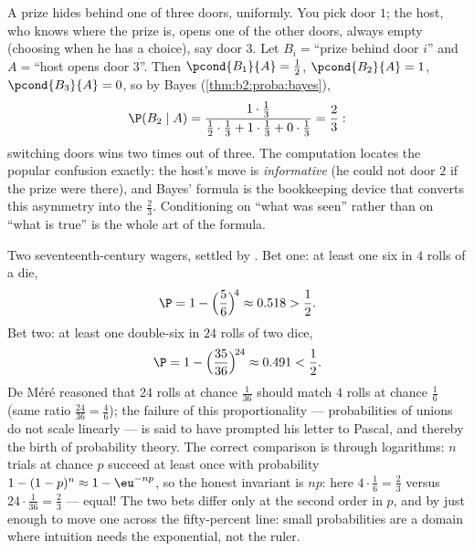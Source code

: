 \begin{example}\label{ex:b2:proba:montyhall}
A prize hides behind one of three doors, uniformly. You pick
door $1$; the host, who knows where the prize is, opens one of
the other doors, always empty (choosing  when he has
a choice), say door $3$. Let $B_i = {}$``prize behind door
$i$'' and $A = {}$``host opens door $3$''. Then
$\pcond{B_1}{A} = \frac12$, $\pcond{B_2}{A} = 1$,
$\pcond{B_3}{A} = 0$, so by Bayes
(\cref{thm:b2:proba:bayes}),
\[
\P(B_2 \mid A)
= \frac{1\cdot\frac13}
{\frac12\cdot\frac13 + 1\cdot\frac13 + 0\cdot\frac13}
= \frac23 :
\]
switching doors wins two times out of three. The computation
locates the popular confusion exactly: the host's move is
\emph{informative} (he could not  door $2$ if the prize
were there), and Bayes' formula is the bookkeeping device
that converts this asymmetry into the $\frac23$. Conditioning
on ``what was seen'' rather than on ``what is true'' is the
whole art of the formula.
\end{example}

\begin{example}\label{ex:b2:proba:demere}
Two seventeenth-century wagers, settled by . Bet
one: at least one six in $4$ rolls of a die,
\[
\P = 1 - \Bigl(\frac56\Bigr)^{\!4} \approx 0.518 > \frac12 .
\]
Bet two: at least one double-six in $24$ rolls of two dice,
\[
\P = 1 - \Bigl(\frac{35}{36}\Bigr)^{\!24} \approx 0.491 <
\frac12 .
\]
De M\'er\'e reasoned that $24$ rolls at chance $\frac1{36}$
should match $4$ rolls at chance $\frac16$ (same ratio
$\frac{24}{36} = \frac46$); the failure of this
proportionality --- probabilities of unions do not scale
linearly --- is said to have prompted his letter to Pascal,
and thereby the birth of probability theory. The correct
comparison is through logarithms: $n$ trials at chance $p$
succeed at least once with probability $1 - (1-p)^n \approx
1 - \eu^{-np}$, so the honest invariant is $np$: here
$4\cdot\frac16 = \frac23$ versus $24\cdot\frac1{36} =
\frac23$ --- equal! The two bets differ only at the second
order in $p$, and by just enough to move one across the
fifty-percent line: small probabilities are a domain where
intuition needs the exponential, not the ruler.
\end{example}


